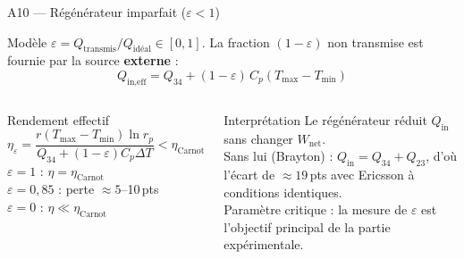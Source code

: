 \documentclass[aspectratio=43, 10pt]{beamer}
\newcommand{\Tmin}{T_{\min}}
\newcommand{\Tmax}{T_{\max}}
\newcommand{\rp}{r_p}
\newcommand{\etaC}{\eta_{\text{Carnot}}}
\newcommand{\Wnet}{W_{\text{net}}}
\newcommand{\Qin}{Q_{\text{in}}}
\begin{document}
\begin{frame}{A10 --- R\'eg\'en\'erateur imparfait ($\varepsilon < 1$)}

  \begin{block}{Mod\`ele}
    \small
    $\varepsilon = Q_{\text{transmis}}/Q_{\text{id\'eal}} \in [0,1]$.
    La fraction $(1-\varepsilon)$ non transmise est fournie
    par la source \textbf{externe} :
    \[
      Q_{\text{in,eff}}
      = Q_{34} + (1-\varepsilon)\,C_p(\Tmax-\Tmin)
    \]
  \end{block}

  \begin{columns}[T,onlytextwidth]
      \begin{alertblock}{Rendement effectif}
        \[
          \eta_\varepsilon
          = \frac{r(\Tmax-\Tmin)\ln\rp}
                 {Q_{34} + (1-\varepsilon)C_p\Delta T}
          < \etaC
        \]
        \small
        $\varepsilon = 1$ : $\eta = \etaC$\\
        $\varepsilon = 0{,}85$ : perte $\approx 5$--10\,pts\\
        $\varepsilon = 0$ : $\eta \ll \etaC$
      \end{alertblock}

      \begin{exampleblock}{Interpr\'etation}
        \small
        Le r\'eg\'en\'erateur r\'eduit $\Qin$ sans
        changer $\Wnet$.\\[3pt]
        Sans lui (Brayton) :
        $Q_{\text{in}} = Q_{34} + Q_{23}$,
        d'o\`u l'\'ecart de $\approx 19$\,pts avec
        Ericsson \`a conditions identiques.\\[3pt]
        Param\`etre critique : la mesure de $\varepsilon$
        est l'objectif principal de la partie exp\'erimentale.
      \end{exampleblock}
  \end{columns}

\end{frame}
\end{document}
